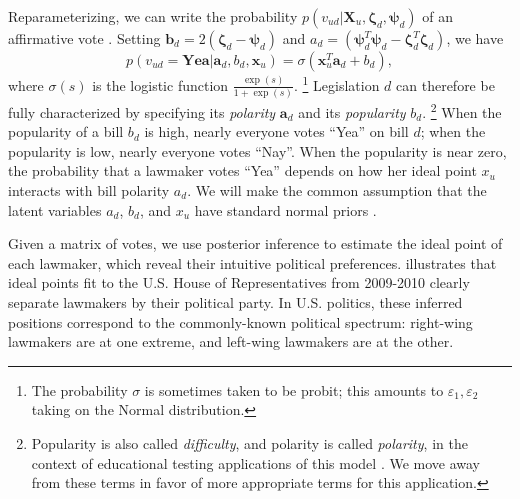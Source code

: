Reparameterizing, we can write the probability $p(v_{ud} | \bm X_u, \bm \zeta_d,
 \bm \psi_d)$ of an affirmative vote
 \citep{clinton:2004}.  Setting $\bm b_d = 2 (\bm \zeta_d
 - \bm \psi_d )$ and $a_d = (\bm \psi_d^T \bm \psi_d - \bm \zeta_d^T
 \bm \zeta_d )$, we have
\begin{equation}
  p(v_{ud} = \textbf{Yea} | \bm a_d, b_d, \bm x_u) = \sigma ( \bm x_u^T \bm a_d + b_d ),
  \label{eq:trad_ipm}
\end{equation}
where $\sigma(s)$ is the logistic function $\frac{\exp(s)}{1 +
  \exp(s)}$. \footnote{The probability $\sigma$ is sometimes taken to
  be probit; this amounts to $\varepsilon_1, \varepsilon_2$ taking on
  the Normal distribution.}  Legislation $d$ can therefore be fully
characterized by specifying its \emph{polarity} $\bm a_d$ and its
\emph{popularity} $b_d$. \footnote{Popularity is also called
  \emph{difficulty}, and polarity is called \emph{polarity}, in the
  context of educational testing applications of this model
  \citep{clinton:2004}.  We move away from these terms in favor of more
  appropriate terms for this application.}  When the popularity of a
bill $b_d$ is high, nearly everyone votes ``Yea'' on bill $d$; when
the popularity is low, nearly everyone votes ``Nay''.  When the
popularity is near zero, the probability that a lawmaker votes ``Yea''
depends on how her ideal point $x_u$ interacts with bill polarity
$a_d$.  We will make the common assumption that the latent variables
$a_d$, $b_d$, and $x_u$ have standard normal priors
\citep{clinton:2004}.

Given a matrix of votes, we use posterior inference to estimate the
ideal point of each lawmaker, which reveal their intuitive political
preferences.   illustrates that ideal
points fit to the U.S. House of Representatives from 2009-2010 clearly
separate lawmakers by their political party.  In U.S. politics, these
inferred positions correspond to the commonly-known political
spectrum: right-wing lawmakers are at one extreme, and left-wing
lawmakers are at the other. %



